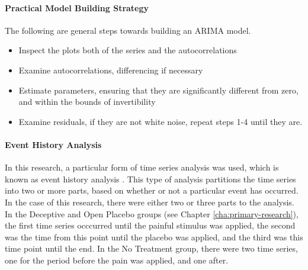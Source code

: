 
\paragraph{Practical Model Building Strategy}

The following are general steps towards building an ARIMA model.

\begin{itemize}
\item Inspect the plots both of the series and the autocorrelations
\item Examine autocorrelations, differencing if necessary
\item Estimate parameters, ensuring that they are significantly different from zero, and within the bounds of invertibility
\item Examine residuals, if they are not white noise, repeat steps 1-4 until they are.
\end{itemize}

\paragraph{Event History Analysis}
\label{sec:event-hist-analys}
In this research, a particular form of time series analysis was used, which is known as event history analysis \cite{mccleary1980applied}. This type of analysis partitions the time series into two or more parts, based on whether or not a particular event has occurred. In the case of this research, there were either two or three parts to the analysis. In the Deceptive and Open Placebo groups (see Chapter \ref{cha:primary-research}), the first time series occcurred until the painful stimulus was applied, the second was the time from this point until the placebo was applied, and the third was this time point until the end. In the No Treatment group, there were two time series, one for the period before the pain was applied, and one after.

